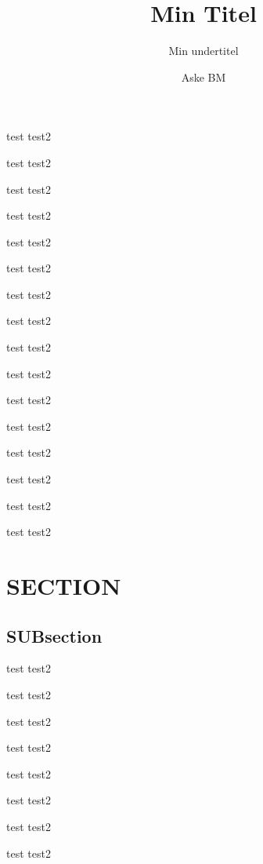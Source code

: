 \documentclass[aspectratio=169]{beamer}
\title{Min Titel}
\subtitle{Min undertitel}
\institute{Teknisk Fakultet Syddansk Universitet}
\author{Aske BM}
\newcommand\TestFr{\begin{frame}
test
\pause%
test2

\end{frame}}
\begin{document}
\begin{frame}[plain]
	\titlepage%
\end{frame}

\setcounter{page}{1}





\TestFr\TestFr\TestFr\TestFr\TestFr\TestFr\TestFr\TestFr%
\TestFr\TestFr\TestFr\TestFr\TestFr\TestFr\TestFr\TestFr%
\section{SECTION}%
\label{sec:section}

\subsection{SUBsection}%
\label{sub:subsection}

\TestFr\TestFr\TestFr\TestFr\TestFr\TestFr\TestFr\TestFr%
\end{document}
